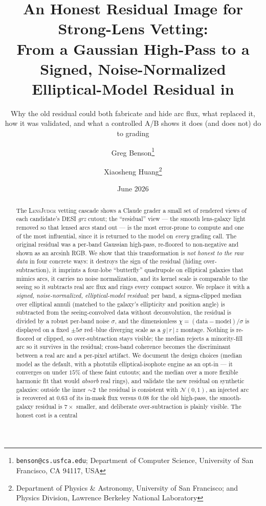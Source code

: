 \documentclass[11pt,letterpaper]{article}
\title{An Honest Residual Image for Strong-Lens Vetting:\\
       From a Gaussian High-Pass to a Signed, Noise-Normalized\\
       Elliptical-Model Residual in \lj{}}
\author{Greg Benson\thanks{\texttt{benson@cs.usfca.edu}; Department of Computer
        Science, University of San Francisco, CA 94117, USA} \and
        Xiaosheng Huang\thanks{Department of Physics \& Astronomy, University of
        San Francisco; and Physics Division, Lawrence Berkeley National Laboratory}}
\date{June 2026}
\newcommand{\lj}{\textsc{LensJudge}}
\begin{document}
\maketitle
\subtitle{Why the old residual could both fabricate and hide arc flux, what replaced it, how it was validated, and what a controlled A/B shows it does (and does not) do to grading}

\begin{abstract}
The \lj{} vetting cascade shows a Claude grader a small set of rendered views of each candidate's DESI
\emph{grz} cutout; the ``residual'' view --- the smooth lens-galaxy light removed so that lensed arcs stand out
--- is the most error-prone to compute and one of the most influential, since it is returned to the model on
\emph{every} grading call. The original residual was a per-band Gaussian high-pass, re-floored to non-negative and
shown as an arcsinh RGB. We show that this transformation is \emph{not honest to the raw data} in four concrete
ways: it destroys the sign of the residual (hiding over-subtraction), it imprints a four-lobe ``butterfly''
quadrupole on elliptical galaxies that mimics arcs, it carries no noise normalization, and its kernel scale is
comparable to the seeing so it subtracts real arc flux and rings every compact source. We replace it with a
\emph{signed, noise-normalized, elliptical-model residual}: per band, a sigma-clipped median over elliptical
annuli (matched to the galaxy's ellipticity and position angle) is subtracted from the seeing-convolved data
without deconvolution, the residual is divided by a robust per-band noise $\sigma$, and the dimensionless
$\chi=(\mathrm{data}-\mathrm{model})/\sigma$ is displayed on a fixed $\pm5\sigma$ red--blue diverging scale as a
$g\,|\,r\,|\,z$ montage. Nothing is re-floored or clipped, so over-subtraction stays visible; the median rejects a
minority-fill arc so it survives in the residual; cross-band coherence becomes the discriminant between a real arc
and a per-pixel artifact. We document the design choices (median model as the default, with a photutils
elliptical-isophote engine as an opt-in --- it converges on under $15\%$ of these faint cutouts; and the
median over a more flexible harmonic fit that would \emph{absorb} real rings), and validate the new residual on
synthetic galaxies: outside the inner $\sim$2\arcsec\ the residual is consistent with $\mathcal{N}(0,1)$, an
injected arc is recovered at $0.63$ of its in-mask flux versus $0.08$ for the old high-pass, the smooth-galaxy
residual is $7\times$ smaller, and deliberate over-subtraction is plainly visible. The honest cost is a central

\end{abstract}
\end{document}
